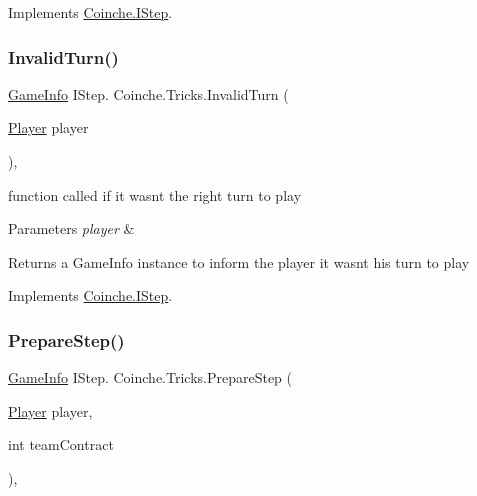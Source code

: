 Implements \hyperlink{interface_coinche_1_1_i_step_a1b410159a7988ae4e75154539715e7ba}{Coinche.\+I\+Step}.

\mbox{\label{class_coinche_1_1_tricks_a298a3f9c18af5a9e2ab7da3c7509075a}} 
\subsubsection{\texorpdfstring{Invalid\+Turn()}{InvalidTurn()}}
{\footnotesize\ttfamily \hyperlink{class_coinche_1_1_tools_1_1_game_info}{Game\+Info} I\+Step. Coinche.\+Tricks.\+Invalid\+Turn (\begin{DoxyParamCaption}\item[{\hyperlink{class_coinche_1_1_player}{Player}}]{player }\end{DoxyParamCaption})\hspace{0.3cm}{\ttfamily [inline]}, {\ttfamily [private]}}



function called if it wasn\textquotesingle{}t the right turn to play 


\begin{DoxyParams}{Parameters}
{\em player} & \\
\hline
\end{DoxyParams}
\begin{DoxyReturn}{Returns}
a Game\+Info instance to inform the player it wasn\textquotesingle{}t his turn to play
\end{DoxyReturn}


Implements \hyperlink{interface_coinche_1_1_i_step_afc64813670860f5ee0829264751abc0a}{Coinche.\+I\+Step}.

\mbox{\label{class_coinche_1_1_tricks_a7d2fedfa7e574f3570d1be83943fa953}} 
\subsubsection{\texorpdfstring{Prepare\+Step()}{PrepareStep()}}
{\footnotesize\ttfamily \hyperlink{class_coinche_1_1_tools_1_1_game_info}{Game\+Info} I\+Step. Coinche.\+Tricks.\+Prepare\+Step (\begin{DoxyParamCaption}\item[{\hyperlink{class_coinche_1_1_player}{Player}}]{player,  }\item[{int}]{team\+Contract }\end{DoxyParamCaption})\hspace{0.3cm}{\ttfamily [inline]}, {\ttfamily [private]}}



